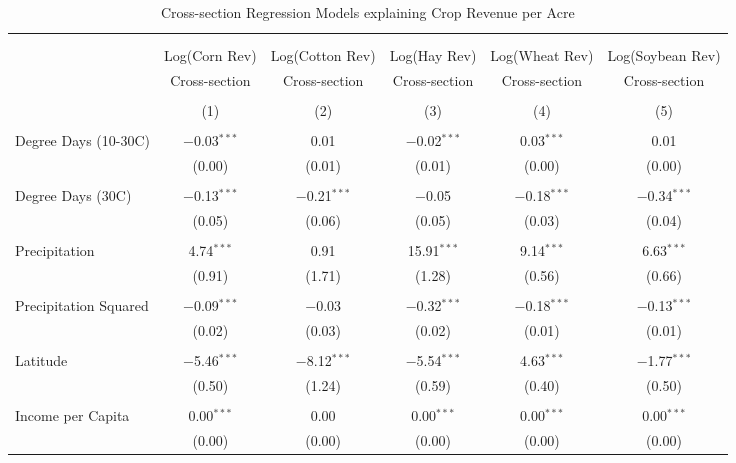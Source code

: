 \documentclass[10pt]{article}
\begin{document}
\newpage
\begin{table}[!htbp] \centering 
  \caption{Cross-section Regression Models explaining Crop Revenue per Acre} 
  \label{} 
\footnotesize 
\begin{tabular}{@{\extracolsep{5pt}}lccccc} 
\\[-1.8ex]\hline 
\hline \\[-1.8ex] 
\\[-1.8ex] & Log(Corn Rev) & Log(Cotton Rev) & Log(Hay Rev) & Log(Wheat Rev) & Log(Soybean Rev) \\ 
 & Cross-section & Cross-section & Cross-section & Cross-section & Cross-section \\ 
\\[-1.8ex] & (1) & (2) & (3) & (4) & (5)\\ 
\hline \\[-1.8ex] 
 Degree Days (10-30C) & $-$0.03$^{***}$ & 0.01 & $-$0.02$^{***}$ & 0.03$^{***}$ & 0.01 \\ 
  & (0.00) & (0.01) & (0.01) & (0.00) & (0.00) \\ 
  & & & & & \\ 
 Degree Days (30C) & $-$0.13$^{***}$ & $-$0.21$^{***}$ & $-$0.05 & $-$0.18$^{***}$ & $-$0.34$^{***}$ \\ 
  & (0.05) & (0.06) & (0.05) & (0.03) & (0.04) \\ 
  & & & & & \\ 
 Precipitation & 4.74$^{***}$ & 0.91 & 15.91$^{***}$ & 9.14$^{***}$ & 6.63$^{***}$ \\ 
  & (0.91) & (1.71) & (1.28) & (0.56) & (0.66) \\ 
  & & & & & \\ 
 Precipitation Squared & $-$0.09$^{***}$ & $-$0.03 & $-$0.32$^{***}$ & $-$0.18$^{***}$ & $-$0.13$^{***}$ \\ 
  & (0.02) & (0.03) & (0.02) & (0.01) & (0.01) \\ 
  & & & & & \\ 
 Latitude & $-$5.46$^{***}$ & $-$8.12$^{***}$ & $-$5.54$^{***}$ & 4.63$^{***}$ & $-$1.77$^{***}$ \\ 
  & (0.50) & (1.24) & (0.59) & (0.40) & (0.50) \\ 
  & & & & & \\ 
 Income per Capita & 0.00$^{***}$ & 0.00 & 0.00$^{***}$ & 0.00$^{***}$ & 0.00$^{***}$ \\ 
  & (0.00) & (0.00) & (0.00) & (0.00) & (0.00) \\ 

\end{tabular}
\end{table}
\end{document}
